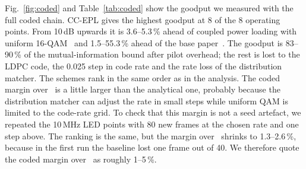 Fig.~\ref{fig:coded} and Table~\ref{tab:coded} show the goodput we measured with the full coded chain. CC-EPL gives the highest goodput at 8 of the 8 operating points. From 10\,dB upwards it is 3.6--5.3\,\% ahead of coupled power loading with uniform 16-QAM~\cite{ling2020} and 1.5--55.3\,\% ahead of the base paper~\cite{pham2026}. The goodput is 83--90\,\% of the mutual-information bound after pilot overhead; the rest is lost to the LDPC code, the 0.025 step in code rate and the rate loss of the distribution matcher. The schemes rank in the same order as in the analysis. The coded margin over~\cite{ling2020} is a little larger than the analytical one, probably because the distribution matcher can adjust the rate in small steps while uniform QAM is limited to the code-rate grid. To check that this margin is not a seed artefact, we repeated the 10\,MHz LED points with 80 new frames at the chosen rate and one step above. The ranking is the same, but the margin over~\cite{ling2020} shrinks to 1.3--2.6\,\%, because in the first run the baseline lost one frame out of 40. We therefore quote the coded margin over~\cite{ling2020} as roughly 1--5\,\%.
